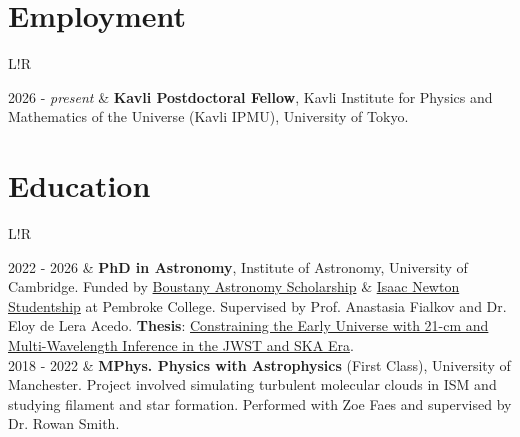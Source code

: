 \documentclass{article}
\begin{document}

\section*{Employment}
\begin{longtable}{L!{\vrule}R}
    
    2026 - \textit{present} & \textbf{Kavli Postdoctoral Fellow}, Kavli Institute for Physics and Mathematics of the Universe (Kavli IPMU), University of Tokyo. \\

\end{longtable}

\section*{Education}
\begin{longtable}{L!{\vrule}R}
	
    2022 - 2026 & \textbf{PhD in Astronomy}, Institute of Astronomy, University of Cambridge. Funded by \href{https://boustany-foundation.org/scholarship-programmes/astronomy-phd-cambridge/}{Boustany Astronomy Scholarship} \& \href{https://www.cambridgetrust.org/partners/institute-of-astronomy}{Isaac Newton Studentship} at Pembroke College. Supervised by Prof. Anastasia Fialkov and Dr. Eloy de Lera Acedo. \textbf{Thesis}: \href{https://www.repository.cam.ac.uk/items/fcde339b-5236-4a48-9e47-70997c55918b}{Constraining the Early Universe with 21-cm and Multi-Wavelength Inference in the JWST and SKA Era}.\\
	
    2018 - 2022 & \textbf{MPhys. Physics with Astrophysics} (First Class), University of Manchester. Project involved simulating turbulent molecular clouds in ISM and studying filament and star formation. Performed with Zoe Faes and supervised by Dr. Rowan Smith. \\
	

\end{longtable}
\end{document}
